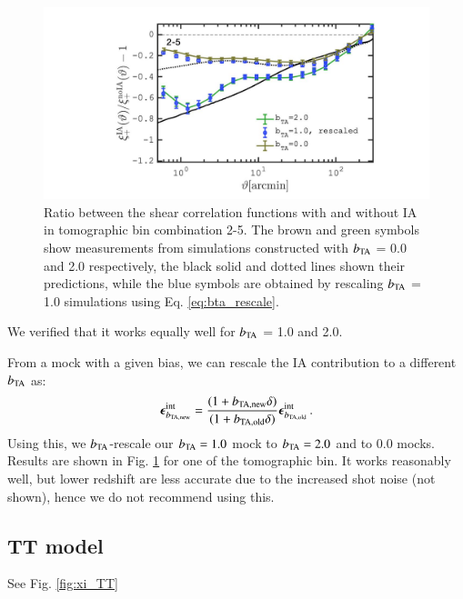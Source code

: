 \documentclass[useAMS,usenatbib]{mn2e}
\begin{document}
\begin{figure}
\includegraphics[width=\columnwidth]{graphs/frac_xip_bta1_rescaled}
\caption{Ratio between the shear correlation functions with and without IA in tomographic bin combination 2-5. The brown and green symbols show measurements from simulations constructed with $b_{\rm TA}$ = 0.0 and 2.0 respectively,  the black solid and dotted lines shown their predictions, while the blue symbols are obtained by rescaling $b_{\rm TA}$ = 1.0 simulations using Eq. \ref{eq:bta_rescale}.  }
\label{fig:xi_deltaNLA_rescaled}
\end{figure}


We verified that it works equally well for $b_{\rm TA}$ = 1.0 and 2.0.


From a mock with a given bias, we can rescale the IA contribution to a different $b_{\rm TA}$  as:
\begin{eqnarray}
{\boldsymbol \epsilon}^{\rm int}_{b_{\rm TA, new}}  = \frac{(1 + b_{\rm TA, new}\delta)}{(1 + b_{\rm TA, old}\delta)}{\boldsymbol \epsilon}^{\rm int}_{b_{\rm TA, old}} \, .
\label{eq:bta_rescale}
\end{eqnarray}
Using this, we $b_{\rm TA}$-rescale our $b_{\rm TA}=1.0$ mock to $b_{\rm TA}=2.0$ and to $0.0$ mocks. Results are shown in Fig. \ref{fig:xi_deltaNLA_rescaled} for one of the tomographic bin. It works reasonably well, but lower redshift are less accurate due to the increased  shot noise (not shown), hence we do not recommend using this.

\subsection{TT model}
\label{subsec:TT}

See Fig. \ref{fig:xi_TT}
\end{document}
